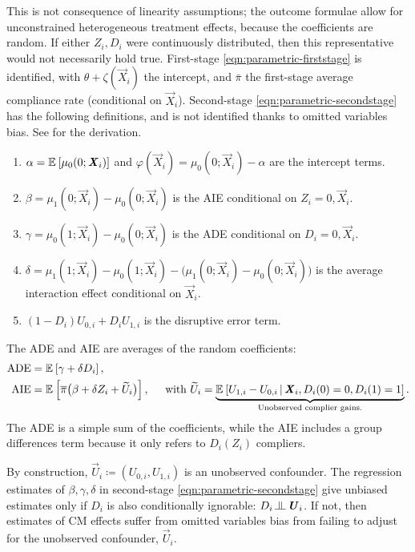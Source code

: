 This is not consequence  of linearity assumptions; the outcome formulae allow for unconstrained heterogeneous treatment effects, because the coefficients are random.
If either $Z_i, D_i$ were continuously distributed, then this representative would not necessarily hold true.
First-stage \eqref{eqn:parametric-firststage} is identified, with $\theta + \zeta(\vec X_i)$ the intercept, and $\bar \pi$ the first-stage average compliance rate (conditional on $\vec X_i$).
Second-stage \eqref{eqn:parametric-secondstage} has the following definitions, and is not identified thanks to omitted variables bias.
See  for the derivation.
\begin{enumerate}[label=\textbf{(\alph*)}]
    \item $\alpha = \mathbb{E}_{} \left[ \mu_0(0; \boldsymbol{\mathit{X}}_i) \right]$ and $\varphi(\vec X_i) = \mu_0(0; \vec X_i) - \alpha$ are the intercept terms.
    \item $\beta = \mu_1(0; \vec X_i) - \mu_0(0; \vec X_i)$ is the AIE conditional on $Z_i = 0, \vec X_i$.
    \item $\gamma = \mu_0(1; \vec X_i) - \mu_0(0; \vec X_i)$ is the ADE conditional on $D_i = 0, \vec X_i$.
    \item $\delta = \mu_1(1; \vec X_i) - \mu_0(1; \vec X_i) - \big( \mu_1(0; \vec X_i) - \mu_0(0; \vec X_i) \big)$ is the average interaction effect conditional on $\vec X_i$.
    \item $\left( 1 - D_i \right) U_{0,i} + D_i U_{1,i}$ is the disruptive error term.
\end{enumerate}

The ADE and AIE are averages of the random coefficients:
\begin{align*}
    \text{ADE}
        &= \mathbb{E}_{} \left[ \gamma + \delta D_i \right], \\
    \text{AIE}
        &= \mathbb{E}_{} \left[  \overline{\pi} \big( \beta +  \delta Z_i + \widetilde{U}_i \big) \right],
        \;\;\;\; \text{ with } \widetilde{U}_i
            = \underbrace{\mathbb{E}_{} \left[  U_{1,i} - U_{0,i} \, \middle\vert \, 
                \boldsymbol{\mathit{X}}_i, D_i(0) = 0, D_i(1) = 1 \right]}_{
                    \text{Unobserved complier gains.}}.
\end{align*}
The ADE is a simple sum of the coefficients, while the AIE includes a group differences term because it only refers to $D_i(Z_i)$ compliers.

By construction, $\vec U_i \coloneqq \left(U_{0, i}, U_{1, i} \right)$ is an unobserved confounder.
The regression estimates of $\beta, \gamma, \delta$ in second-stage \eqref{eqn:parametric-secondstage} give unbiased estimates only if $D_i$ is also conditionally ignorable: $D_i \indep  \vec U_{i} $.
If not, then estimates of CM effects suffer from omitted variables bias from failing to adjust for the unobserved confounder, $\vec U_i$.

